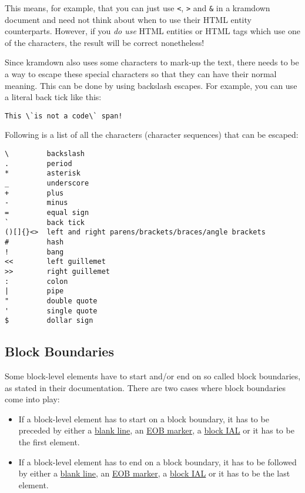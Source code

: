 \documentclass[a4paper]{article}
\begin{document}
This means, for example, that you can just use \texttt{\textless{}},
\texttt{\textgreater{}} and \texttt{\&} in a kramdown document and need
not think about when to use their HTML entity counterparts. However, if
you \emph{do use} HTML entities or HTML tags which use one of the
characters, the result will be correct nonetheless!

Since kramdown also uses some characters to mark-up the text, there
needs to be a way to escape these special characters so that they can
have their normal meaning. This can be done by using backslash escapes.
For example, you can use a literal back tick like this:

\begin{verbatim}
This \`is not a code\` span!
\end{verbatim}

Following is a list of all the characters (character sequences) that can
be escaped:

\begin{verbatim}
\         backslash
.         period
*         asterisk
_         underscore
+         plus
-         minus
=         equal sign
`         back tick
()[]{}<>  left and right parens/brackets/braces/angle brackets
#         hash
!         bang
<<        left guillemet
>>        right guillemet
:         colon
|         pipe
"         double quote
'         single quote
$         dollar sign
\end{verbatim}

\hypertarget{block-boundaries}{\subsection{Block
Boundaries}\label{block-boundaries}}

Some block-level elements have to start and/or end on so called block
boundaries, as stated in their documentation. There are two cases where
block boundaries come into play:

\begin{itemize}
\item
  If a block-level element has to start on a block boundary, it has to
  be preceded by either a \protect\hyperlink{blank-lines}{blank line},
  an \protect\hyperlink{eob-marker}{EOB marker}, a
  \protect\hyperlink{block-ials}{block IAL} or it has to be the first
  element.
\item
  If a block-level element has to end on a block boundary, it has to be
  followed by either a \protect\hyperlink{blank-lines}{blank line}, an
  \protect\hyperlink{eob-marker}{EOB marker}, a
  \protect\hyperlink{block-ials}{block IAL} or it has to be the last
  element.
\end{itemize}
\end{document}
